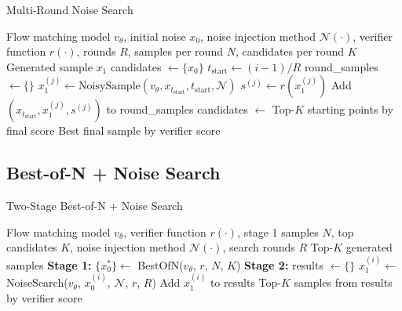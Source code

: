 \documentclass{article}
\begin{document}
\begin{algorithm}[H]
\caption{Multi-Round Noise Search}
\label{alg:noise-search}
\begin{algorithmic}[1]
\Require Flow matching model $v_\theta$, initial noise $x_0$, noise injection method $\mathcal{N}(\cdot)$, verifier function $r(\cdot)$, rounds $R$, samples per round $N$, candidates per round $K$
\Ensure Generated sample $x_1$
\State candidates $\leftarrow \{x_0\}$ 
    \State $t_{\text{start}} \leftarrow (i-1) / R$ 
    \State round\_samples $\leftarrow \{\}$
            \State $x_1^{(j)} \leftarrow \text{NoisySample}(v_\theta, x_{t_{\text{start}}}, t_{\text{start}}, \mathcal{N})$
            \State $s^{(j)} \leftarrow r(x_1^{(j)})$
            \State Add $(x_{t_{\text{start}}}, x_1^{(j)}, s^{(j)})$ to round\_samples
        \EndFor
    \EndFor
        \State candidates $\leftarrow$ Top-$K$ starting points by final score
    \Else
        \State \Return Best final sample by verifier score
    \EndIf
\EndFor
\end{algorithmic}
\end{algorithm}

\subsection{Best-of-N + Noise Search}

\begin{algorithm}[H]
\caption{Two-Stage Best-of-N + Noise Search}
\label{alg:best-of-n-noise-search}
\begin{algorithmic}[1]
\Require Flow matching model $v_\theta$, verifier function $r(\cdot)$, stage 1 samples $N$, top candidates $K$, noise injection method $\mathcal{N}(\cdot)$, search rounds $R$
\Ensure Top-$K$ generated samples
\State \textbf{Stage 1:} $\{x_0^*\} \leftarrow$ BestOfN($v_\theta$, $r$, $N$, $K$) 
\State \textbf{Stage 2:} results $\leftarrow \{\}$
    \State $x_1^{(i)} \leftarrow$ NoiseSearch($v_\theta$, $x_0^{(i)}$, $\mathcal{N}$, $r$, $R$) 
    \State Add $x_1^{(i)}$ to results
\EndFor
\State \Return Top-$K$ samples from results by verifier score
\end{algorithmic}
\end{algorithm}
\end{document}
